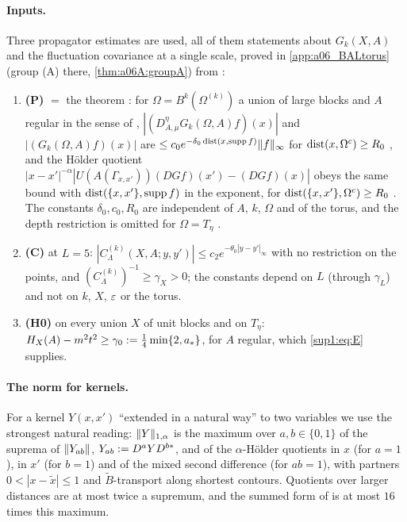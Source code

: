 \paragraph{Inputs.} Three propagator estimates are used, all of them statements about $G_k(X,A)$ and the fluctuation covariance at a single scale, proved in \cref{app:a06_BALtorus} (group (A) there, \cref{thm:a06A:groupA}) from \cite{Ba4}:
\begin{enumerate}[label=\textup{(\roman*)},nosep,leftmargin=*]
\item \textbf{(P)} \cite[Prop.~2.1]{Ba1} $=$ the theorem \cite[(1.9)--(1.12)]{Ba4}: for $\Omega=B^k(\Omega^{(k)})$ a union of large blocks and $A$ regular in the sense of \cite[(2.23)]{Ba1}, $|(D^\eta_{A,\mu}G_k(\Omega,A)f)(x)|$ and $|(G_k(\Omega,A)f)(x)|$ are $\le c_0e^{-\delta_0\operatorname{dist}(x,\operatorname{supp} f)}\lVert f\rVert_\infty$ for $\operatorname{dist}(x,\Omega^c)\ge R_0$ \cite[(2.25)]{Ba1}, and the H\"older quotient $|x-x'|^{-\alpha}|U(A(\Gamma_{x,x'}))(DGf)(x')-(DGf)(x)|$ obeys the same bound with $\operatorname{dist}(\{x,x'\},\operatorname{supp} f)$ in the exponent, for $\operatorname{dist}(\{x,x'\},\Omega^c)\ge R_0$ \cite[(2.24)]{Ba1}. The constants $\delta_0,c_0,R_0$ are independent of $A$, $k$, $\Omega$ and of the torus, and the depth restriction is omitted for $\Omega=T_\eta$ \cite[pp.~610--611]{Ba1}.
\item \textbf{(C)} \cite[Prop.~2.3, (2.33)--(2.34)]{Ba1} at $L=5$: $|C^{(k)}_\Lambda(X,A;y,y')|\le c_2e^{-\theta_0|y-y'|_\infty}$ with no restriction on the points, and $(C^{(k)}_\Lambda)^{-1}\ge\gamma_X>0$; the constants depend on $L$ (through $\gamma_L$) and not on $k$, $X$, $\varepsilon$ or the torus.
\item \textbf{(H0)} \cite[(1.8)]{Ba4} on every union $X$ of unit blocks and on $T_\eta$: $H_X(A)-m^2t^2\ge\gamma_0:=\frac14\min\{2,a_*\}$, for $A$ regular, which \eqref{sup1:eq:E} supplies.
\end{enumerate}

\paragraph{The norm \cite[(1.32)]{Ba3} for kernels.} For a kernel $Y(x,x')$ ``extended in a natural way'' to two variables \cite[p.~420]{Ba3} we use the strongest natural reading: $\lVert Y\rVert_{1,\alpha}$ is the maximum over $a,b\in\{0,1\}$ of the suprema of $\lVert Y_{ab}\rVert$, $Y_{ab}:= D^aYD^{b*}$, and of the $\alpha$-H\"older quotients in $x$ (for $a=1$), in $x'$ (for $b=1$) and of the mixed second difference (for $ab=1$), with partners $0<|x-\tilde x|\le1$ and $\tilde B$-transport along shortest contours. Quotients over larger distances are at most twice a supremum, and the summed form of \cite[(1.32)]{Ba3} is at most $16$ times this maximum.
